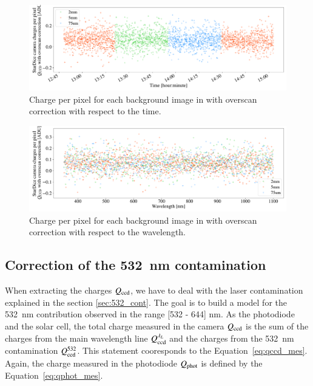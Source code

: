 
\begin{figure}[h]
    \centering
    \includegraphics[width=\columnwidth]{fig/background_stationary_time.pdf}
    \caption{Charge per pixel for each background image in \SD with overscan correction with respect to the time.}
    \label{fig:stationarity_time}
\end{figure}

\begin{figure}[h]
    \centering
    \includegraphics[width=\columnwidth]{fig/background_stationary_wavelength.pdf}
    \caption{Charge per pixel for each background image in \SD with overscan correction with respect to the wavelength.}
    \label{fig:stationarity_wl}
\end{figure}

\subsection{Correction of the \SI{532}{\nano\meter} contamination}

When extracting the charges $Q_{\mathrm{ccd}}$, we have to deal with the laser contamination explained in the section \ref{sec:532_cont}. The goal is to build a model for the \SI{532}{\nano\meter} contribution observed in the range [532 - 644] nm. As the photodiode and the solar cell, the total charge measured in the \SD camera $Q_{\mathrm{ccd}}$ is the sum of the charges from the main wavelength line $Q_{\mathrm{ccd}}^{\lambda_L}$ and the charges from the \SI{532}{\nm} contamination $Q_{\mathrm{ccd}}^{532}$. This statement cooresponds to the Equation~\ref{eq:qccd_mes}. Again, the charge measured in the photodiode $Q_{\mathrm{phot}}$ is defined by the Equation~\ref{eq:qphot_mes}.
 
